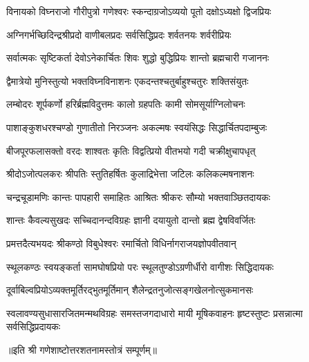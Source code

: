 
\twolineshloka
{विनायको विघ्नराजो गौरीपुत्रो गणेश्वरः}
{स्कन्दाग्रजोऽव्ययो पूतो दक्षोऽध्यक्षो द्विजप्रियः}

\twolineshloka
{अग्निगर्भच्छिदिन्द्रश्रीप्रदो वाणीबलप्रदः}
{सर्वसिद्धिप्रदः शर्वतनयः शर्वरीप्रियः}

\twolineshloka
{सर्वात्मकः सृष्टिकर्ता देवोऽनेकार्चितः शिवः}
{शुद्धो बुद्धिप्रियः शान्तो ब्रह्मचारी गजाननः}

\twolineshloka
{द्वैमात्रेयो मुनिस्तुत्यो भक्तविघ्नविनाशनः}
{एकदन्तश्चतुर्बाहुश्चतुरः शक्तिसंयुतः}

\twolineshloka
{लम्बोदरः शूर्पकर्णो हरिर्ब्रह्मविदुत्तमः}
{कालो ग्रहपतिः कामी सोमसूर्याग्निलोचनः}

\twolineshloka
{पाशाङ्कुशधरश्चण्डो गुणातीतो निरञ्जनः}
{अकल्मषः स्वयंसिद्धः सिद्धार्चितपदाम्बुजः}

\twolineshloka
{बीजपूरफलासक्तो वरदः शाश्वतः कृतिः}
{विद्वत्प्रियो वीतभयो गदी चक्रीक्षुचापधृत्}

\twolineshloka
{श्रीदोऽजोत्पलकरः श्रीपतिः स्तुतिहर्षितः}
{कुलाद्रिभेत्ता जटिलः कलिकल्मषनाशनः}

\twolineshloka
{चन्द्रचूडामणिः कान्तः पापहारी समाहितः}
{आश्रितः श्रीकरः सौम्यो भक्तवाञ्छितदायकः}

\twolineshloka
{शान्तः कैवल्यसुखदः सच्चिदानन्दविग्रहः}
{ज्ञानी दयायुतो दान्तो ब्रह्म द्वेषविवर्जितः}

\twolineshloka
{प्रमत्तदैत्यभयदः श्रीकण्ठो विबुधेश्वरः}
{रमार्चितो विधिर्नागराजयज्ञोपवीतवान्}

\twolineshloka
{स्थूलकण्ठः स्वयङ्कर्ता सामघोषप्रियो परः}
{स्थूलतुण्डोऽग्रणीर्धीरो वागीशः सिद्धिदायकः}

\twolineshloka
{दूर्वाबिल्वप्रियोऽव्यक्तमूर्तिरद्भुतमूर्तिमान्}
{शैलेन्द्रतनुजोत्सङ्गखेलनोत्सुकमानसः}

\threelineshloka
{स्वलावण्यसुधासारजितमन्मथविग्रहः}
{समस्तजगदाधारो मायी मूषिकवाहनः}
{हृष्टस्तुष्टः प्रसन्नात्मा सर्वसिद्धिप्रदायकः}

{॥इति श्री गणेशाष्टोत्तरशतनामस्तोत्रं सम्पूर्णम्॥}
